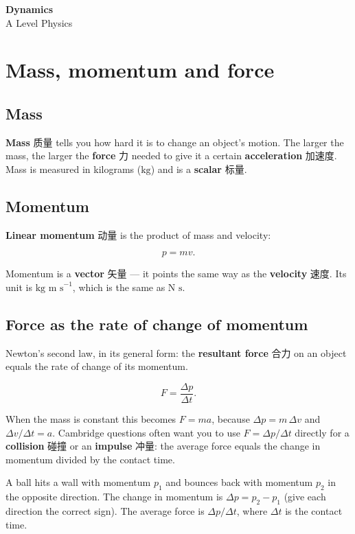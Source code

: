 \documentclass[11pt]{article}
\begin{document}
\begin{center}
  {\LARGE\bfseries Dynamics}\\[0.35em]
  {\large A Level Physics}
\end{center}
\vspace{0.6em}

\section*{Mass, momentum and force}

\subsection*{Mass}

\textbf{Mass} 质量 tells you how hard it is to change an object's motion. The larger the mass, the larger the \textbf{force} 力 needed to give it a certain \textbf{acceleration} 加速度. Mass is measured in kilograms ($\text{kg}$) and is a \textbf{scalar} 标量.

\subsection*{Momentum}

\textbf{Linear momentum} 动量 is the product of mass and velocity:

\[
p = mv.
\]

Momentum is a \textbf{vector} 矢量 — it points the same way as the \textbf{velocity} 速度. Its unit is $\text{kg m s}^{-1}$, which is the same as $\text{N s}$.

\subsection*{Force as the rate of change of momentum}

Newton's second law, in its general form: the \textbf{resultant force} 合力 on an object equals the rate of change of its momentum.

\[
F = \frac{\Delta p}{\Delta t}.
\]

When the mass is constant this becomes $F = ma$, because $\Delta p = m\,\Delta v$ and $\Delta v / \Delta t = a$. Cambridge questions often want you to use $F = \Delta p / \Delta t$ directly for a \textbf{collision} 碰撞 or an \textbf{impulse} 冲量: the average force equals the change in momentum divided by the contact time.

A ball hits a wall with momentum $p_{1}$ and bounces back with momentum $p_{2}$ in the opposite direction. The change in momentum is $\Delta p = p_{2} - p_{1}$ (give each direction the correct sign). The average force is $\Delta p / \Delta t$, where $\Delta t$ is the contact time.
\end{document}
